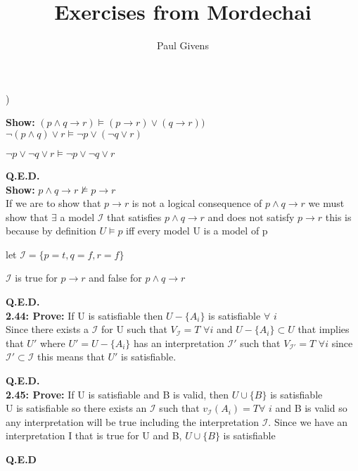 \documentclass[letterpaper]{article}
\title{Exercises from Mordechai}
\author{Paul Givens}
\begin{document}
) 

\textbf{Show:}
$ (p \wedge q \rightarrow r) \vDash (p \rightarrow r) \vee (q \rightarrow r)) $
\\[1ex]

$ \neg (p \wedge q) \vee r \vDash \neg p \vee (\neg q \vee r) $

$ \neg p \vee \neg q \vee r \vDash \neg p \vee \neg q \vee r $ 

\textbf{Q.E.D.}
\\[1ex]

\textbf{Show:}
$ p \wedge q \rightarrow r \nvDash p \rightarrow r $
\\[1ex]

If we are to show that $ p \rightarrow r $ is not a logical consequence of
$ p \wedge q \rightarrow r $ we must show that $ \exists $ a model
$ \mathscr{I} $ that satisfies $ p \wedge q \rightarrow r $ and does not 
satisfy $ p \rightarrow r $ this is because by definition 
$ U \vDash p $ iff every model U is a model of p 

let $ \mathscr{I} = \{ p = t, q = f, r = f\}$ 

$ \mathscr{I} $ is true for $ p \rightarrow r $ and false for 
$ p \wedge q \rightarrow r $

\textbf{Q.E.D.}
\\[1ex]

\textbf{2.44: Prove:}
If U is satisfiable then $ U - \{A _{i} \} $ is satisfiable $ \forall $ $i$ 
\\[1ex]

Since there exists a $ \mathscr{I} $ for U such that $V_{\mathscr{I}} = T $ 
$\forall i$ and $  U - \{A _{i} \} \subset U$ that implies that $U'$ 
where $U' =  U - \{A _{i} \}$ has an interpretation $\mathscr{I}'$ such that 
$V_{\mathscr{I}'} = T $ $\forall i$ since $\mathscr{I}' \subset \mathscr{I}$
this means that $U'$ is satisfiable.

\textbf{Q.E.D.}
\\[1ex]

\textbf{2.45: Prove:}
If U is satisfiable and B is valid, then $ U \cup \{B\} $ is satisfiable
\\[1ex]

U is satisfiable so there exists an $\mathscr{I}$ such that $v_{\mathscr{I}}
(A_{i}) = T \forall$ $i$ and B is valid so any interpretation will be true
including the interpretation $\mathscr{I}$. Since we have an interpretation
I that is true for U and B, $U \cup \{B\} $ is satisfiable

\textbf{Q.E.D}
\end{document}
